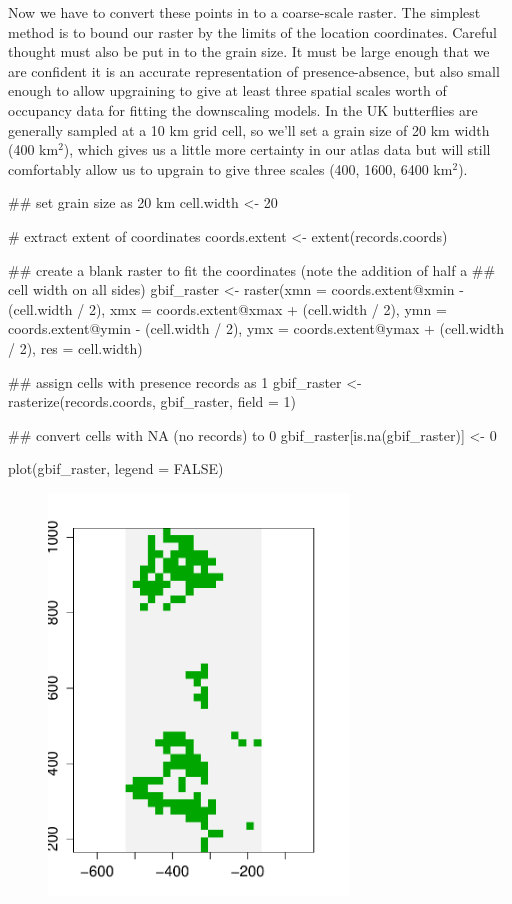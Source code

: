 \documentclass{article}[12pt, a4paper]
\begin{document}
\newpage
Now we have to convert these points in to a coarse-scale raster. The simplest method is to bound our raster by the limits of the location coordinates. Careful thought must also be put in to the grain size. It must be large enough that we are confident it is an accurate representation of presence-absence, but also small enough to allow upgraining to give at least three spatial scales worth of occupancy data for fitting the downscaling models. In the UK butterflies are generally sampled at a 10 km grid cell, so we'll set a grain size of 20 km width (400 km$^2$), which gives us a little more certainty in our atlas data but will still comfortably allow us to upgrain to give three scales (400, 1600, 6400 km$^2$).

\begin{Schunk}
\begin{Sinput}
## set grain size as 20 km
cell.width <- 20

# extract extent of coordinates
coords.extent <- extent(records.coords)

## create a blank raster to fit the coordinates (note the addition of half a 
## cell width on all sides)
gbif_raster <- raster(xmn = coords.extent@xmin - (cell.width / 2),
                      xmx = coords.extent@xmax + (cell.width / 2),
                      ymn = coords.extent@ymin - (cell.width / 2),
                      ymx = coords.extent@ymax + (cell.width / 2),
                      res = cell.width)
                      
## assign cells with presence records as 1
gbif_raster <- rasterize(records.coords, gbif_raster, field = 1)

## convert cells with NA (no records) to 0
gbif_raster[is.na(gbif_raster)] <- 0

plot(gbif_raster, legend = FALSE)
\end{Sinput}
\end{Schunk}

\begin{figure}[!ht]
\centering
\includegraphics[width=8cm]{Downscaling-downscale32}
\end{figure}
\end{document}
